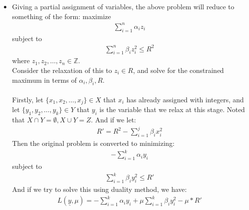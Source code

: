 \documentclass[11pt,letterpaper]{article}
\begin{document}
\begin{tcolorbox}
    \begin{itemize}
        \item Giving a partial assignment of variables, the above problem will reduce to something of the form: maximize
        \begin{align}
            \sum_{i=1}^n \alpha_i z_i
        \end{align}
        subject to
        \begin{align}
            \sum_{i=1}^n \beta_i z_i^2 \leq R^2
        \end{align}
        where $z_1,z_2,\dots,z_n \in \mathbb{Z}$. \\
        Consider the relaxation of this to $z_i \in R$, and solve for the constrained maximum in terms of ${\alpha_i}, {\beta_i}, R$.
        \\\\
        Firstly, let $\{x_1,x_2,\dots,x_j \} \in X$ that $x_i$ has already assigned with integers, and let $\{y_1,y_2,\dots,y_k \} \in Y$ that $y_i$ is the variable that we relax at this stage. Noted that $X \cap Y = \emptyset, X \cup Y = Z$. And if we let:
        \begin{align*}
            R' = R^2 - \sum_{i=1}^j \beta_i x_i^2 
        \end{align*}
        Then the original problem is converted to minimizing:
        \begin{align*}
            -\sum_{i=1}^k \alpha_i y_i
        \end{align*}
        subject to
        \begin{align*}
            \sum_{i=1}^k \beta_i y_i^2 \leq R'
        \end{align*}
        And if we try to solve this using duality method, we have:
        \begin{align*}
            L(\underline y,\mu) =  -\sum_{i=1}^k \alpha_i y_i + \mu \sum_{i=1}^k \beta_i y_i^2 - \mu * R'
        \end{align*}
    \end{itemize}
\end{tcolorbox}

\newpage
\end{document}
